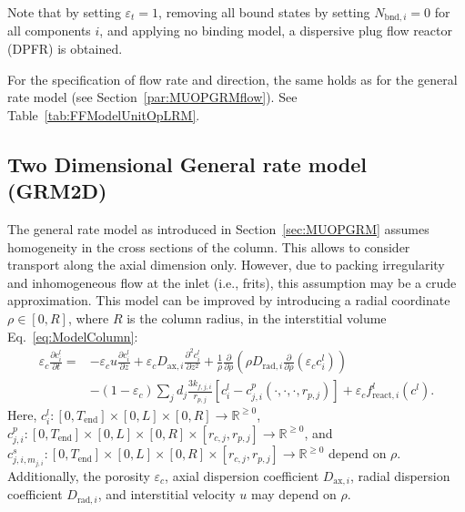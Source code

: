 Note that by setting $\varepsilon_t = 1$, removing all bound states by setting $N_{\text{bnd},i} = 0$ for all components $i$, and applying no binding model, a dispersive plug flow reactor (DPFR) is obtained.

For the specification of flow rate and direction, the same holds as for the general rate model (see Section~\ref{par:MUOPGRMflow}).
See Table~\ref{tab:FFModelUnitOpLRM}.

\subsection{Two Dimensional General rate model (GRM2D)}\label{sec:MUOPGRM2D}

The general rate model as introduced in Section~\ref{sec:MUOPGRM} assumes homogeneity in the cross sections of the column.
This allows to consider transport along the axial dimension only.
However, due to packing irregularity and inhomogeneous flow at the inlet (i.e., frits), this assumption may be a crude approximation.
This model can be improved by introducing a radial coordinate $\rho \in [0, R]$, where $R$ is the column radius, in the interstitial volume Eq.~\eqref{eq:ModelColumn}:
\begin{equation} \begin{split}
	\varepsilon_c \frac{\partial c^l_i}{\partial t} = &-\varepsilon_c u \frac{\partial c^l_i}{\partial z} + \varepsilon_c D_{\text{ax},i} \frac{\partial^2 c^l_i}{\partial z^2} + \frac{1}{\rho} \frac{\partial}{\partial \rho} \left( \rho D_{\text{rad},i} \frac{\partial}{\partial \rho} \left( \varepsilon_c c^l_i \right) \right) \\ &- \left(1 - \varepsilon_c\right) \sum_j d_j \frac{ 3 k_{f,j,i} }{r_{p,j}} \left[ c^l_i - c^p_{j,i}(\cdot, \cdot, \cdot, r_{p,j}) \right] + \varepsilon_c f_{\text{react},i}^l\left(c^l\right). \label{eq:ModelColumn2D}
\end{split} \end{equation}
Here, $c^l_i\colon \left[0, T_{\text{end}}\right] \times [0, L] \times [0, R] \rightarrow \mathds{R}^{\geq 0}$, $c^p_{j,i}\colon \left[0, T_{\text{end}}\right] \times [0, L] \times [0, R] \times [r_{c,j}, r_{p,j}] \rightarrow \mathds{R}^{\geq 0}$, and $c^s_{j,i,m_{j,i}}\colon \left[0, T_{\text{end}}\right] \times [0, L] \times [0, R] \times [r_{c,j}, r_{p,j}] \rightarrow \mathds{R}^{\geq 0}$ depend on $\rho$.
Additionally, the porosity $\varepsilon_c$, axial dispersion coefficient $D_{\text{ax},i}$, radial dispersion coefficient $D_{\text{rad},i}$, and interstitial velocity $u$ may depend on $\rho$.

